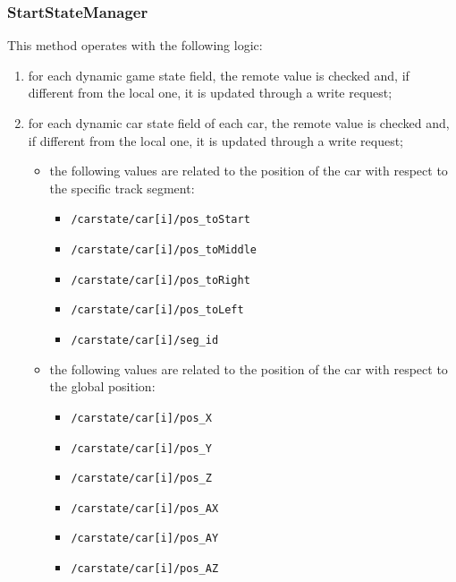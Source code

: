 \subsubsection{StartStateManager}
This method operates with the following logic:
\begin{enumerate}
	\item for each dynamic game state field, the remote value is checked and, if different from the local one, it is updated through a write request;
	\item for each dynamic car state field of each car, the remote value is checked and, if different from the local one, it is updated through a write request;
	\begin{itemize}
		\item the following values are related to the position of the car with respect to the specific track segment:
		\begin{itemize}
			\item \texttt{/carstate/car[i]/pos\_toStart}
			\item \texttt{/carstate/car[i]/pos\_toMiddle}
			\item \texttt{/carstate/car[i]/pos\_toRight}
			\item \texttt{/carstate/car[i]/pos\_toLeft}
			\item \texttt{/carstate/car[i]/seg\_id}
		\end{itemize}
		\item the following values are related to the position of the car with respect to the global position:
		\begin{itemize}
			\item \texttt{/carstate/car[i]/pos\_X}
			\item \texttt{/carstate/car[i]/pos\_Y}
			\item \texttt{/carstate/car[i]/pos\_Z}
			\item \texttt{/carstate/car[i]/pos\_AX}
			\item \texttt{/carstate/car[i]/pos\_AY}
			\item \texttt{/carstate/car[i]/pos\_AZ}
		\end{itemize}
	\end{itemize}
\end{enumerate}

